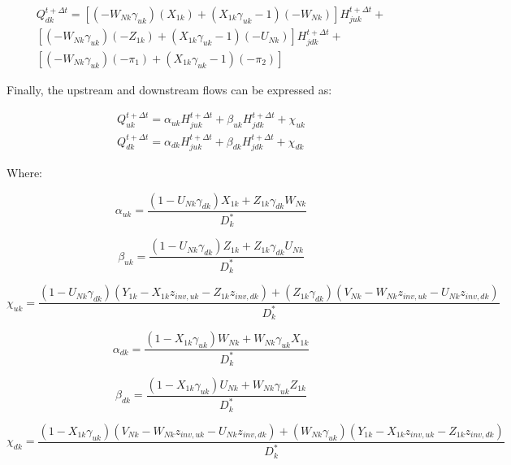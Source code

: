 \documentclass[11pt]{article}
\begin{document}
\begin{equation}
  \begin{split}
    Q_{dk}^{t + \Delta t} = 
    [(-W_{Nk} \gamma_{uk})(X_{1k}) + (X_{1k} \gamma_{uk} - 1)(-W_{Nk})] H_{juk}^{t + \Delta t} + \\
    [(-W_{Nk} \gamma_{uk})(-Z_{1k}) + (X_{1k} \gamma_{uk} - 1)(-U_{Nk})] H_{jdk}^{t + \Delta t} + \\
    [(-W_{Nk} \gamma_{uk})(- \pi_1) + (X_{1k} \gamma_{uk} - 1)(-\pi_2)]
  \end{split}
\end{equation}

Finally, the upstream and downstream flows can be expressed as:

\begin{align}
 Q_{uk}^{t + \Delta t} = \alpha_{uk} H_{juk}^{t + \Delta t} + \beta_{uk} H_{jdk}^{t + \Delta t} + \chi_{uk} \\ 
 Q_{dk}^{t + \Delta t} = \alpha_{dk} H_{juk}^{t + \Delta t} + \beta_{dk} H_{jdk}^{t + \Delta t} + \chi_{dk} 
\end{align}

Where:

\begin{equation}
  \alpha_{uk} = \frac{(1 - U_{Nk} \gamma_{dk}) X_{1k} + Z_{1k} \gamma_{dk} W_{Nk}}{D_k^*}
\end{equation}

\begin{equation}
  \beta_{uk} = \frac{(1 - U_{Nk} \gamma_{dk}) Z_{1k} + Z_{1k} \gamma_{dk} U_{Nk}}{D_k^*}
\end{equation}

\begin{equation}
  \chi_{uk} = \frac{(1 - U_{Nk} \gamma_{dk})(Y_{1k} - X_{1k} z_{inv, uk} - Z_{1k} z_{inv, dk})  + (Z_{1k} \gamma_{dk})(V_{Nk} - W_{Nk} z_{inv, uk} - U_{Nk} z_{inv, dk})}{D_k^*}
\end{equation}

\begin{equation}
  \alpha_{dk} = \frac{(1 - X_{1k} \gamma_{uk}) W_{Nk} + W_{Nk} \gamma_{uk} X_{1k}}{D_k^*}
\end{equation}

\begin{equation}
  \beta_{dk} = \frac{(1 - X_{1k} \gamma_{uk}) U_{Nk} + W_{Nk} \gamma_{uk} Z_{1k}}{D_k^*}
\end{equation}

\begin{equation}
  \chi_{dk} = \frac{(1 - X_{1k} \gamma_{uk})(V_{Nk} - W_{Nk} z_{inv, uk} - U_{Nk} z_{inv, dk})  + (W_{Nk} \gamma_{uk})(Y_{1k} - X_{1k} z_{inv, uk} - Z_{1k} z_{inv, dk})}{D_k^*}
\end{equation}
\end{document}
